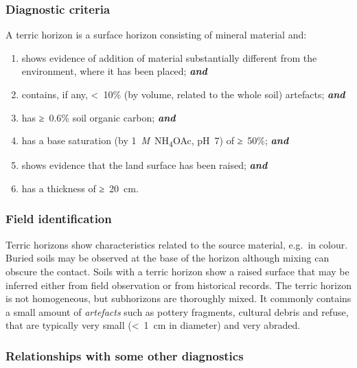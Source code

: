 \documentclass[
  letterpaper,
  DIV=11,
  numbers=noendperiod]{scrreprt}
\begin{document}
\hypertarget{diagnostic-criteria-35}{%
\subsubsection{Diagnostic criteria}\label{diagnostic-criteria-35}}

A terric horizon is a surface horizon consisting of mineral material
and:

\begin{enumerate}
\def\labelenumi{\arabic{enumi}.}
\item
  shows evidence of addition of material substantially different from
  the environment, where it has been placed; \textbf{\emph{and}}
\item
  contains, if any, \textless~10\% (by volume, related to the whole
  soil) artefacts; \textbf{\emph{and}}
\item
  has ≥~0.6\% soil organic carbon; \textbf{\emph{and}}
\item
  has a base saturation (by 1~\emph{M}~NH\textsubscript{4}OAc, pH~7) of
  ≥~50\%; \textbf{\emph{and}}
\item
  shows evidence that the land surface has been raised;
  \textbf{\emph{and}}
\item
  has a thickness of ≥~20~cm.
\end{enumerate}

\hypertarget{field-identification-27}{%
\subsubsection{Field identification}\label{field-identification-27}}

Terric horizons show characteristics related to the source material,
e.g.~in colour. Buried soils may be observed at the base of the horizon
although mixing can obscure the contact. Soils with a terric horizon
show a raised surface that may be inferred either from field observation
or from historical records. The terric horizon is not homogeneous, but
subhorizons are thoroughly mixed. It commonly contains a small amount of
\emph{artefacts} such as pottery fragments, cultural debris and refuse,
that are typically very small (\textless~1~cm in diameter) and very
abraded.

\hypertarget{relationships-with-some-other-diagnostics-34}{%
\subsubsection{Relationships with some other
diagnostics}\label{relationships-with-some-other-diagnostics-34}}
\end{document}
